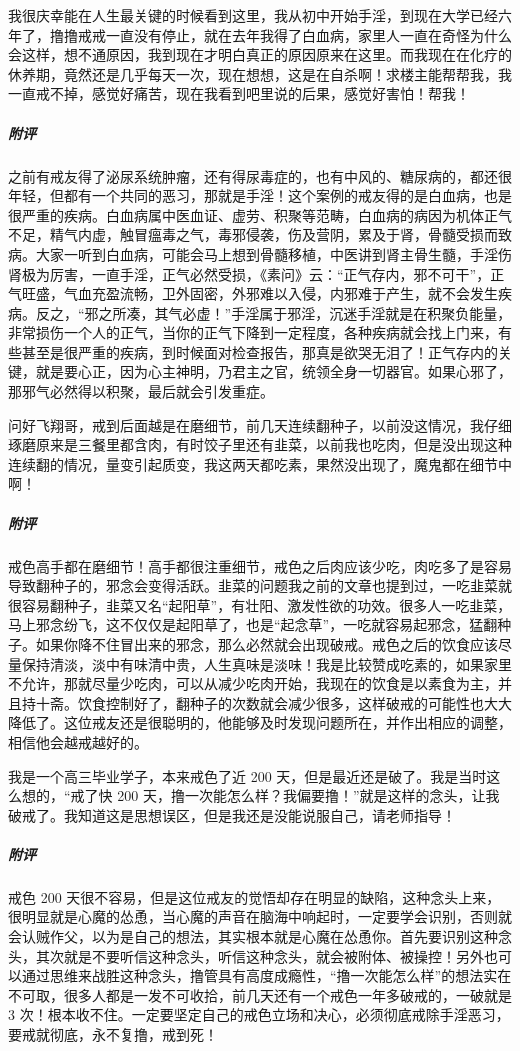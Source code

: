 \begin{case}
    我很庆幸能在人生最关键的时候看到这里，我从初中开始手淫，到现在大学已经六年了，撸撸戒戒一直没有停止，就在去年我得了白血病，家里人一直在奇怪为什么会这样，想不通原因，我到现在才明白真正的原因原来在这里。而我现在在化疗的休养期，竟然还是几乎每天一次，现在想想，这是在自杀啊！求楼主能帮帮我，我一直戒不掉，感觉好痛苦，现在我看到吧里说的后果，感觉好害怕！帮我！
    \subparagraph{附评} 之前有戒友得了泌尿系统肿瘤，还有得尿毒症的，也有中风的、糖尿病的，都还很年轻，但都有一个共同的恶习，那就是手淫！这个案例的戒友得的是白血病，也是很严重的疾病。白血病属中医血证、虚劳、积聚等范畴，白血病的病因为机体正气不足，精气内虚，触冒瘟毒之气，毒邪侵袭，伤及营阴，累及于肾，骨髓受损而致病。大家一听到白血病，可能会马上想到骨髓移植，中医讲到肾主骨生髓，手淫伤肾极为厉害，一直手淫，正气必然受损，《素问》云：“正气存内，邪不可干”，正气旺盛，气血充盈流畅，卫外固密，外邪难以入侵，内邪难于产生，就不会发生疾病。反之，“邪之所凑，其气必虚！”手淫属于邪淫，沉迷手淫就是在积聚负能量，非常损伤一个人的正气，当你的正气下降到一定程度，各种疾病就会找上门来，有些甚至是很严重的疾病，到时候面对检查报告，那真是欲哭无泪了！正气存内的关键，就是要心正，因为心主神明，乃君主之官，统领全身一切器官。如果心邪了，那邪气必然得以积聚，最后就会引发重症。
\end{case}

\begin{case}
    问好飞翔哥，戒到后面越是在磨细节，前几天连续翻种子，以前没这情况，我仔细琢磨原来是三餐里都含肉，有时饺子里还有韭菜，以前我也吃肉，但是没出现这种连续翻的情况，量变引起质变，我这两天都吃素，果然没出现了，魔鬼都在细节中啊！
    \subparagraph{附评} 戒色高手都在磨细节！高手都很注重细节，戒色之后肉应该少吃，肉吃多了是容易导致翻种子的，邪念会变得活跃。韭菜的问题我之前的文章也提到过，一吃韭菜就很容易翻种子，韭菜又名“起阳草”，有壮阳、激发性欲的功效。很多人一吃韭菜，马上邪念纷飞，这不仅仅是起阳草了，也是“起念草”，一吃就容易起邪念，猛翻种子。如果你降不住冒出来的邪念，那么必然就会出现破戒。戒色之后的饮食应该尽量保持清淡，淡中有味清中贵，人生真味是淡味！我是比较赞成吃素的，如果家里不允许，那就尽量少吃肉，可以从减少吃肉开始，我现在的饮食是以素食为主，并且持十斋。饮食控制好了，翻种子的次数就会减少很多，这样破戒的可能性也大大降低了。这位戒友还是很聪明的，他能够及时发现问题所在，并作出相应的调整，相信他会越戒越好的。
\end{case}

\begin{case}
    我是一个高三毕业学子，本来戒色了近 200 天，但是最近还是破了。我是当时这么想的，“戒了快 200 天，撸一次能怎么样？我偏要撸！”就是这样的念头，让我破戒了。我知道这是思想误区，但是我还是没能说服自己，请老师指导！
    \subparagraph{附评} 戒色 200 天很不容易，但是这位戒友的觉悟却存在明显的缺陷，这种念头上来，很明显就是心魔的怂恿，当心魔的声音在脑海中响起时，一定要学会识别，否则就会认贼作父，以为是自己的想法，其实根本就是心魔在怂恿你。首先要识别这种念头，其次就是不要听信这种念头，听信这种念头，就会被附体、被操控！另外也可以通过思维来战胜这种念头，撸管具有高度成瘾性，“撸一次能怎么样”的想法实在不可取，很多人都是一发不可收拾，前几天还有一个戒色一年多破戒的，一破就是 3 次！根本收不住。一定要坚定自己的戒色立场和决心，必须彻底戒除手淫恶习，要戒就彻底，永不复撸，戒到死！
\end{case}

